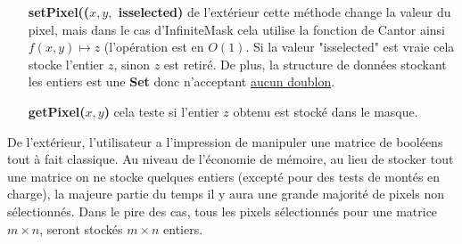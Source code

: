 \begin{itemize}
\item[\textbf{setPixel(($x,y,$ isselected)}] de l'extérieur cette méthode change la valeur du pixel, mais dans le cas d'InfiniteMask
cela utilise la fonction de Cantor ainsi $f(x,y)  \mapsto z$ (l'opération est en $ O(1)$. Si la valeur "isselected" est vraie cela stocke l'entier $z$, sinon
$z$ est retiré. De plus, la structure de données stockant les entiers est une \textbf{Set} donc n'acceptant \underline{aucun doublon}.
\vspace*{0.2cm}
\item[\textbf{getPixel($x,y$)}] cela teste si l'entier $z$ obtenu est stocké dans le masque.
\end{itemize}

\newpage
De l'extérieur, l'utilisateur a l'impression de manipuler une matrice de booléens tout à fait classique.
Au niveau de l'économie de mémoire, au lieu de stocker tout une matrice on ne stocke quelques entiers
(excepté pour des tests de montés en charge), la majeure partie du temps il y aura une grande majorité de pixels non sélectionnés.
Dans le pire des cas, tous les pixels sélectionnés pour une matrice $m\times n$, seront stockés $m\times n$ entiers.
